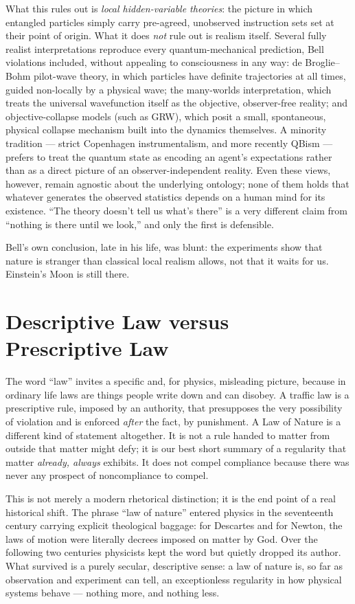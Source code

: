 What this rules out is \emph{local hidden-variable theories}: the picture
in which entangled particles simply carry pre-agreed, unobserved
instruction sets set at their point of origin. What it does \emph{not} rule
out is realism itself. Several fully realist interpretations reproduce
every quantum-mechanical prediction, Bell violations included, without
appealing to consciousness in any way: de Broglie--Bohm pilot-wave theory,
in which particles have definite trajectories at all times, guided
non-locally by a physical wave; the many-worlds interpretation, which
treats the universal wavefunction itself as the objective, observer-free
reality; and objective-collapse models (such as GRW), which posit a small,
spontaneous, physical collapse mechanism built into the dynamics
themselves. A minority tradition --- strict Copenhagen instrumentalism, and
more recently QBism --- prefers to treat the quantum state as encoding an
agent's expectations rather than as a direct picture of an
observer-independent reality. Even these views, however, remain agnostic
about the underlying ontology; none of them holds that whatever generates
the observed statistics depends on a human mind for its existence. ``The
theory doesn't tell us what's there'' is a very different claim from
``nothing is there until we look,'' and only the first is defensible.

Bell's own conclusion, late in his life, was blunt: the experiments show
that nature is stranger than classical local realism allows, not that it
waits for us. Einstein's Moon is still there.

\section{Descriptive Law versus Prescriptive Law}
\label{sec:descriptive-law}

The word ``law'' invites a specific and, for physics, misleading picture,
because in ordinary life laws are things people write down and can
disobey. A traffic law is a prescriptive rule, imposed by an authority,
that presupposes the very possibility of violation and is enforced
\emph{after} the fact, by punishment. A Law of Nature is a different kind
of statement altogether. It is not a rule handed to matter from outside
that matter might defy; it is our best short summary of a regularity that
matter \emph{already, always} exhibits. It does not compel compliance
because there was never any prospect of noncompliance to compel.

This is not merely a modern rhetorical distinction; it is the end point of
a real historical shift. The phrase ``law of nature'' entered physics in
the seventeenth century carrying explicit theological baggage: for
Descartes and for Newton, the laws of motion were literally decrees
imposed on matter by God. Over the following two centuries physicists kept
the word but quietly dropped its author. What survived is a purely
secular, descriptive sense: a law of nature is, so far as observation and
experiment can tell, an exceptionless regularity in how physical systems
behave --- nothing more, and nothing less.

